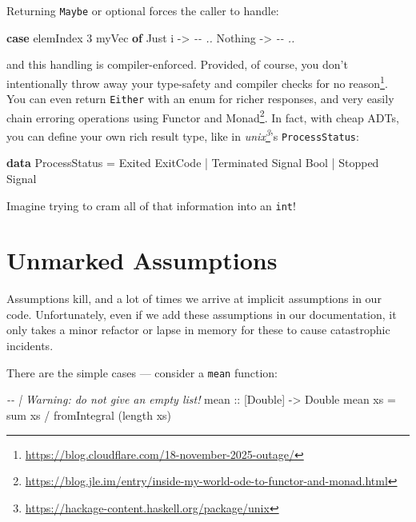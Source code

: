 \documentclass[]{article}
\newenvironment{Shaded}{}{}
\newcommand{\CommentTok}[1]{\textcolor[rgb]{0.38,0.63,0.69}{\textit{#1}}}
\newcommand{\DataTypeTok}[1]{\textcolor[rgb]{0.56,0.13,0.00}{#1}}
\newcommand{\DecValTok}[1]{\textcolor[rgb]{0.25,0.63,0.44}{#1}}
\newcommand{\FunctionTok}[1]{\textcolor[rgb]{0.02,0.16,0.49}{#1}}
\newcommand{\KeywordTok}[1]{\textcolor[rgb]{0.00,0.44,0.13}{\textbf{#1}}}
\newcommand{\NormalTok}[1]{#1}
\newcommand{\OperatorTok}[1]{\textcolor[rgb]{0.40,0.40,0.40}{#1}}
\newcommand{\OtherTok}[1]{\textcolor[rgb]{0.00,0.44,0.13}{#1}}
\renewcommand{\href}[2]{#2\footnote{\url{#1}}}
\begin{document}
Returning \texttt{Maybe} or optional forces the caller to handle:

\begin{Shaded}
\begin{Highlighting}[]
\KeywordTok{case}\NormalTok{ elemIndex }\DecValTok{3}\NormalTok{ myVec }\KeywordTok{of}
  \DataTypeTok{Just}\NormalTok{ i }\OtherTok{{-}\textgreater{}} \CommentTok{{-}{-} ..}
  \DataTypeTok{Nothing} \OtherTok{{-}\textgreater{}} \CommentTok{{-}{-} ..}
\end{Highlighting}
\end{Shaded}

and this handling is compiler-enforced. Provided, of course, you don't
\href{https://blog.cloudflare.com/18-november-2025-outage/}{intentionally throw
away your type-safety and compiler checks for no reason}. You can even return
\texttt{Either} with an enum for richer responses, and very easily
\href{https://blog.jle.im/entry/inside-my-world-ode-to-functor-and-monad.html}{chain
erroring operations using Functor and Monad}. In fact, with cheap ADTs, you can
define your own rich result type, like in
\emph{\href{https://hackage-content.haskell.org/package/unix}{unix}}'s
\texttt{ProcessStatus}:

\begin{Shaded}
\begin{Highlighting}[]
\KeywordTok{data} \DataTypeTok{ProcessStatus}
   \OtherTok{=} \DataTypeTok{Exited} \DataTypeTok{ExitCode}
   \OperatorTok{|} \DataTypeTok{Terminated} \DataTypeTok{Signal} \DataTypeTok{Bool}
   \OperatorTok{|} \DataTypeTok{Stopped} \DataTypeTok{Signal}
\end{Highlighting}
\end{Shaded}

Imagine trying to cram all of that information into an \texttt{int}!

\section{Unmarked Assumptions}\label{unmarked-assumptions}

Assumptions kill, and a lot of times we arrive at implicit assumptions in our
code. Unfortunately, even if we add these assumptions in our documentation, it
only takes a minor refactor or lapse in memory for these to cause catastrophic
incidents.

There are the simple cases --- consider a \texttt{mean} function:

\begin{Shaded}
\begin{Highlighting}[]
\CommentTok{{-}{-} | Warning: do not give an empty list!}
\OtherTok{mean ::}\NormalTok{ [}\DataTypeTok{Double}\NormalTok{] }\OtherTok{{-}\textgreater{}} \DataTypeTok{Double}
\NormalTok{mean xs }\OtherTok{=} \FunctionTok{sum}\NormalTok{ xs }\OperatorTok{/} \FunctionTok{fromIntegral}\NormalTok{ (}\FunctionTok{length}\NormalTok{ xs)}
\end{Highlighting}
\end{Shaded}
\end{document}
